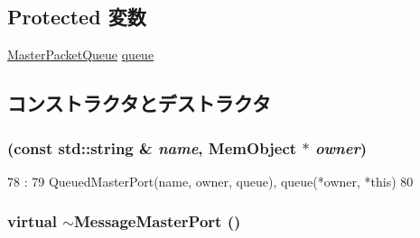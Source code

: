 \subsection*{Protected 変数}
\begin{DoxyCompactItemize}
\item 
\hyperlink{classMasterPacketQueue}{MasterPacketQueue} \hyperlink{classMessageMasterPort_aae3ed0c3ef8ff189915e74fe401279b5}{queue}
\end{DoxyCompactItemize}


\subsection{コンストラクタとデストラクタ}
\hypertarget{classMessageMasterPort_a6de9d9e9415eba856e517eade3e594a4}{
\subsubsection[{MessageMasterPort}]{ (const std::string \& {\em name}, \/  {\bf MemObject} $\ast$ {\em owner})}}
\label{classMessageMasterPort_a6de9d9e9415eba856e517eade3e594a4}



\begin{DoxyCode}
78                                                                :
79         QueuedMasterPort(name, owner, queue), queue(*owner, *this)
80     {}

\end{DoxyCode}
\hypertarget{classMessageMasterPort_ab01c989cee75a49762e58a658c890528}{
\subsubsection[{$\sim$MessageMasterPort}]{\setlength{\rightskip}{0pt plus 5cm}virtual $\sim${\bf MessageMasterPort} ()}}
\label{classMessageMasterPort_ab01c989cee75a49762e58a658c890528}



